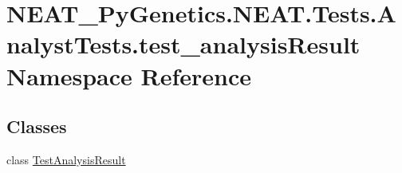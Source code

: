 \hypertarget{namespaceNEAT__PyGenetics_1_1NEAT_1_1Tests_1_1AnalystTests_1_1test__analysisResult}{}\section{N\+E\+A\+T\+\_\+\+Py\+Genetics.\+N\+E\+A\+T.\+Tests.\+Analyst\+Tests.\+test\+\_\+analysis\+Result Namespace Reference}
\label{namespaceNEAT__PyGenetics_1_1NEAT_1_1Tests_1_1AnalystTests_1_1test__analysisResult}
\subsection*{Classes}
\begin{DoxyCompactItemize}
\item 
class \hyperlink{classNEAT__PyGenetics_1_1NEAT_1_1Tests_1_1AnalystTests_1_1test__analysisResult_1_1TestAnalysisResult}{Test\+Analysis\+Result}
\end{DoxyCompactItemize}
